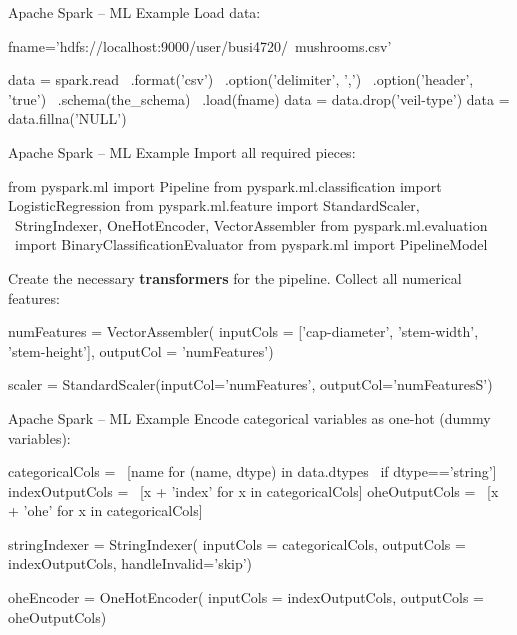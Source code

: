 \documentclass[ignorenonframetext,xcolor=x11names]{beamer}
\begin{document}
\begin{frame}[label=withcode,fragile]{Apache Spark -- ML Example}
Load data:
\begin{pythoncode}
fname='hdfs://localhost:9000/user/busi4720/\
mushrooms.csv'

data = spark.read \
    .format('csv') \
    .option('delimiter', ',') \
    .option('header', 'true') \
    .schema(the_schema) \
    .load(fname)
data = data.drop('veil-type')
data = data.fillna('NULL')
\end{pythoncode}
\end{frame}

\begin{frame}[label=withcode,fragile]{Apache Spark -- ML Example}
Import all required pieces:
\begin{pythoncode}
from pyspark.ml import Pipeline
from pyspark.ml.classification import LogisticRegression
from pyspark.ml.feature import StandardScaler, \
    StringIndexer, OneHotEncoder, VectorAssembler
from pyspark.ml.evaluation \
    import BinaryClassificationEvaluator
from pyspark.ml import PipelineModel
\end{pythoncode}
Create the necessary \textbf{transformers} for the pipeline. Collect all numerical features:
\begin{pythoncode}
numFeatures = VectorAssembler(
    inputCols = ['cap-diameter', 'stem-width', 
                 'stem-height'],
    outputCol = 'numFeatures')

scaler = StandardScaler(inputCol='numFeatures',
                        outputCol='numFeaturesS')
\end{pythoncode}
\end{frame}

\begin{frame}[label=withcode,fragile]{Apache Spark -- ML Example}
Encode categorical variables as one-hot (dummy variables):
\begin{pythoncode}
categoricalCols = \
    [name for (name, dtype) in data.dtypes \
        if dtype=='string']
indexOutputCols = \
    [x + 'index' for x in categoricalCols]
oheOutputCols = \
    [x + 'ohe' for x in categoricalCols]

stringIndexer = StringIndexer(
    inputCols = categoricalCols,
    outputCols = indexOutputCols,
    handleInvalid='skip')

oheEncoder = OneHotEncoder(
    inputCols = indexOutputCols,
    outputCols = oheOutputCols)
\end{pythoncode}
\end{frame}
\end{document}
